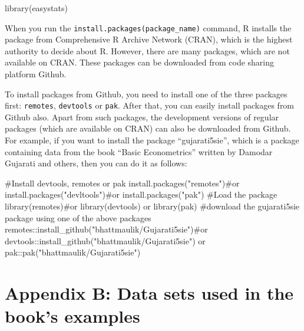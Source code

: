 \documentclass[
  letterpaper,
  twoside,
  openright,
  headsepline,
  footsepline,
  listof = totocnumbered,
  chapterprefix = true,
  titlepage = false]{scrbook}
\newenvironment{Shaded}{\begin{snugshade}}{\end{snugshade}}
\newcommand{\CommentTok}[1]{\textcolor[rgb]{0.37,0.37,0.37}{#1}}
\newcommand{\FunctionTok}[1]{\textcolor[rgb]{0.28,0.35,0.67}{#1}}
\newcommand{\NormalTok}[1]{\textcolor[rgb]{0.00,0.23,0.31}{#1}}
\newcommand{\SpecialCharTok}[1]{\textcolor[rgb]{0.37,0.37,0.37}{#1}}
\newcommand{\StringTok}[1]{\textcolor[rgb]{0.13,0.47,0.30}{#1}}
\begin{document}
\begin{Shaded}
\begin{Highlighting}[numbers=left,,]
\FunctionTok{library}\NormalTok{(easystats)}
\end{Highlighting}
\end{Shaded}

When you run the \texttt{install.packages(package\_name)} command, R
installs the package from Comprehensive R Archive Network (CRAN), which
is the highest authority to decide about R. However, there are many
packages, which are not available on CRAN. These packages can be
downloaded from code sharing platform Github.

To install packages from Github, you need to install one of the three
packages first: \texttt{remotes}, \texttt{devtools} or \texttt{pak}.
After that, you can easily install packages from Github also. Apart from
such packages, the development versions of regular packages (which are
available on CRAN) can also be downloaded from Github. For example, if
you want to install the package ``gujarati5sie'', which is a package
containing data from the book ``Basic Econometrics'' written by Damodar
Gujarati and others, then you can do it as follows:

\begin{Shaded}
\begin{Highlighting}[numbers=left,,]
\CommentTok{\#Install devtools, remotes or pak}
\FunctionTok{install.packages}\NormalTok{(}\StringTok{"remotes"}\NormalTok{)}\CommentTok{\#or install.packages("devltools")\#or install.packages("pak")}
\CommentTok{\#Load the package}
\FunctionTok{library}\NormalTok{(remotes)}\CommentTok{\#or library(devtools) or library(pak)}
\CommentTok{\#download the gujarati5sie package using one of the above packages}
\NormalTok{remotes}\SpecialCharTok{::}\FunctionTok{install\_github}\NormalTok{(}\StringTok{"bhattmaulik/Gujarati5sie"}\NormalTok{)}\CommentTok{\#or devtools::install\_github("bhattmaulik/Gujarati5sie") or pak::pak("bhattmaulik/Gujarati5sie")}
\end{Highlighting}
\end{Shaded}

\hypertarget{appendix-b-data-sets-used-in-the-books-examples}{%
\chapter*{Appendix B: Data sets used in the book's
examples}\label{appendix-b-data-sets-used-in-the-books-examples}}
\end{document}

